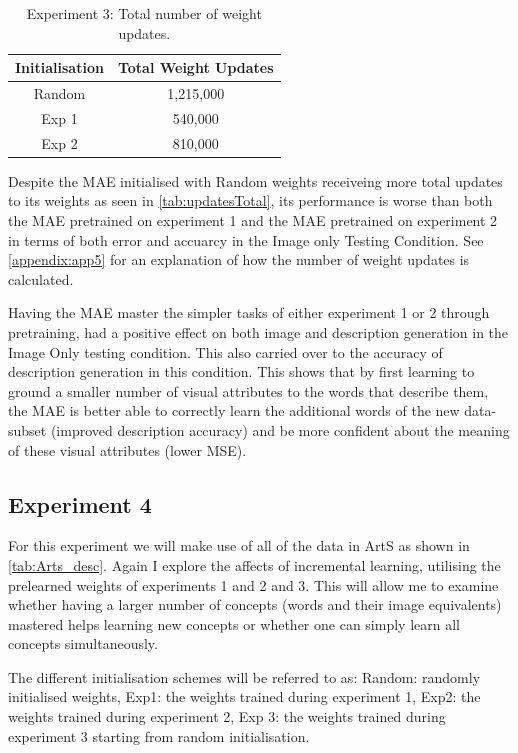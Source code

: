 \begin{table}
\centering
\begin{tabular}{|c|c|}
\hline
\textbf{Initialisation} & \textbf{Total Weight Updates}\\ \hline
Random &  1,215,000\\ \hline
Exp 1 &  540,000\\ \hline
Exp 2 &  810,000\\ \hline

\end{tabular}
\caption{Experiment 3: Total number of weight updates.}
\label{tab:updatesTotal}
\end{table}

Despite the \ac{MAE} initialised with Random weights receiveing more total updates to its weights as seen in \autoref{tab:updatesTotal}, its performance is worse than both the \ac{MAE} pretrained on experiment 1 and the MAE pretrained on experiment 2 in terms of both error and accuarcy in the Image only Testing Condition. See \autoref{appendix:app5} for an explanation of how the number of weight updates is calculated.

Having the \ac{MAE} master the simpler tasks of either experiment 1 or 2 through pretraining, had a positive effect on both image and description generation in the Image Only testing condition. This also carried over to the accuracy of description generation in this condition. This shows that by first learning to ground a smaller number of visual attributes to the words that describe them, the \ac{MAE} is better able to correctly learn the additional words of the new data-subset (improved description accuracy) and be more confident about the meaning of these visual attributes (lower \ac{MSE}).


\newpage
\subsection{Experiment 4}
For this experiment we will make use of all of the data in ArtS as shown in \autoref{tab:Arts_desc}. Again I explore the affects of incremental learning, utilising the prelearned weights of experiments 1 and 2 and 3. This will allow me to examine whether having a larger number of concepts (words and their image equivalents) mastered  helps learning new concepts or whether one can simply learn all concepts simultaneously.

The different initialisation schemes will be referred to as: Random: randomly initialised weights, Exp1: the weights trained during experiment 1, Exp2: the weights trained during experiment 2, Exp 3: the weights trained during experiment 3 starting from random initialisation.
%

